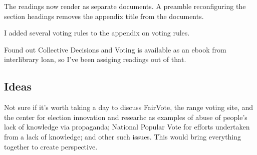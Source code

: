 The readings now render as separate documents.  A preamble reconfiguring the section headings removes the appendix title from the documents.

I added several voting rules to the appendix on voting rules.

Found out Collective Decisions and Voting \autocite{Tideman2006} is available as an ebook from interlibrary loan, so I've been assiging readings out of that.

\subsection{Ideas}

Not sure if it's worth taking a day to discuss FairVote, the range voting site, and the center for election innovation and researhc as examples of abuse of people's lack of knowledge via propaganda; National Popular Vote for efforts undertaken from a lack of knowledge; and other such issues.  This would bring everything together to create perspective.
